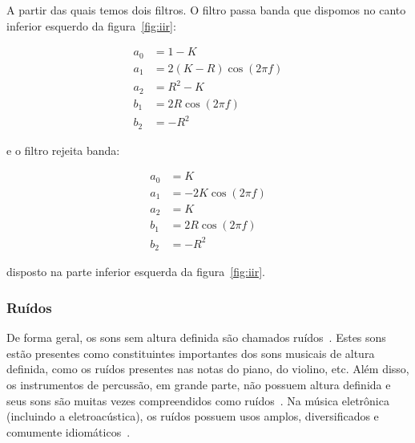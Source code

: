 \begin{enumerate}
A partir das quais temos dois filtros. O filtro passa banda que dispomos no canto inferior esquerdo da figura~\ref{fig:iir}:

\begin{equation}\label{eq:passa-banda}
\begin{split}
a_0 & =  1 - K \\
a_1 & =  2(K-R)\cos (2\pi f) \\
a_2 & =  R^2-K \\
b_1 & =  2R \cos (2\pi f) \\
b_2 & =  -R^2
\end{split}
\end{equation}

e o filtro rejeita banda:

\begin{equation}\label{eq:rejeita-banda}
\begin{split}
a_0 & =  K \\
a_1 & =  -2K\cos (2\pi f) \\
a_2 & =  K \\
b_1 & =  2R \cos (2\pi f) \\
b_2 & =  -R^2
\end{split}
\end{equation}

disposto na parte inferior esquerda da figura~\ref{fig:iir}.


\end{enumerate}

\subsubsection{Ruídos}
De forma geral, os sons sem altura definida 
são chamados ruídos~\cite{Lacerda}.
Estes sons estão presentes como constituintes importantes dos sons musicais de altura definida,
como os ruídos presentes nas notas do piano, do violino, etc. Além disso, os instrumentos
de percussão, em grande parte, não possuem altura definida e seus sons
são muitas vezes compreendidos como ruídos~\cite{Roederer}. Na música eletrônica (incluindo
a eletroacústica), os ruídos possuem usos amplos, diversificados e comumente
idiomáticos~\cite{Cook}.

